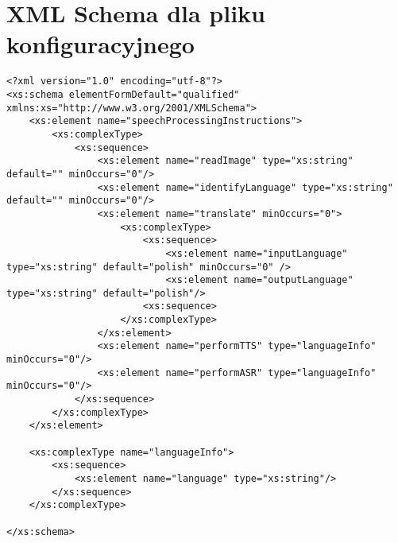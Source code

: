 \documentclass[a4paper, twoside,11pt, openright]{Latex/Classes/PhDthesisPSnPDF}
\begin{document}



%



\listoffigures	%
\renewcommand*{\lstlistlistingname}{Spis fragmentów kodu}
\lstlistoflistings


\appendix
\chapter{XML Schema dla pliku konfiguracyjnego}
\begin{lstlisting}
<?xml version="1.0" encoding="utf-8"?>
<xs:schema elementFormDefault="qualified" xmlns:xs="http://www.w3.org/2001/XMLSchema">
	<xs:element name="speechProcessingInstructions">
		<xs:complexType>
			<xs:sequence>
				<xs:element name="readImage" type="xs:string" default="" minOccurs="0"/>
				<xs:element name="identifyLanguage" type="xs:string" default="" minOccurs="0"/>
				<xs:element name="translate" minOccurs="0">
					<xs:complexType>
						<xs:sequence>
							<xs:element name="inputLanguage" type="xs:string" default="polish" minOccurs="0" />
							<xs:element name="outputLanguage" type="xs:string" default="polish"/>
						<xs:sequence>
					</xs:complexType>
				</xs:element>
				<xs:element name="performTTS" type="languageInfo" minOccurs="0"/>
				<xs:element name="performASR" type="languageInfo" minOccurs="0"/>
			</xs:sequence>
		</xs:complexType>
	</xs:element>
			
	<xs:complexType name="languageInfo">
		<xs:sequence>
			<xs:element name="language" type="xs:string"/>
		</xs:sequence>
	</xs:complexType>
	
</xs:schema>
\end{lstlisting}
\end{document}
